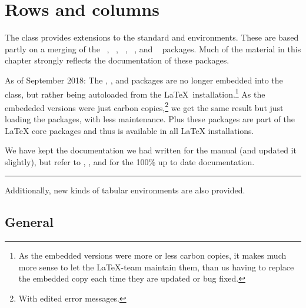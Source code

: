 
 \chapter{Rows and columns}

    The class provides extensions to the standard  and 
environments. These are based partly on a merging of the
 ~\cite{ARRAY}, 
 ~\cite{DCOLUMN},
 ~\cite{DELARRAY}, 
 ~\cite{TABULARX}, and 
 ~\cite{BOOKTABS} 
 packages. 
    Much of the material in this chapter strongly reflects the
documentation of these packages.

\begin{note}
  As of September 2018: The , ,
   and  packages are no longer embedded
  into the class, but rather being autoloaded from the \LaTeX\
  installation.\footnote{As the embedded versions were more or less
    carbon copies, it makes much more sense to let the \LaTeX-team
    maintain them, than us having to replace the embedded copy each
    time they are updated or bug fixed.} As the embededed versions
  were just carbon copies,\footnote{With edited error messages.} we
  get the same result but just loading the packages, with less
  maintenance. Plus these packages are part of the \LaTeX{} core
  packages and thus is available in all \LaTeX{} installations.

  We have kept the documentation we had written for the manual (and
  updated it slightly), but refer to \cite{ARRAY}, \cite{DELARRAY}, \cite{TABULARX} and
  \cite{DCOLUMN} for the 100\% up to date documentation.
\end{note}

\fancybreak{}


 Additionally, new kinds of tabular environments are also provided.


\section{General}

